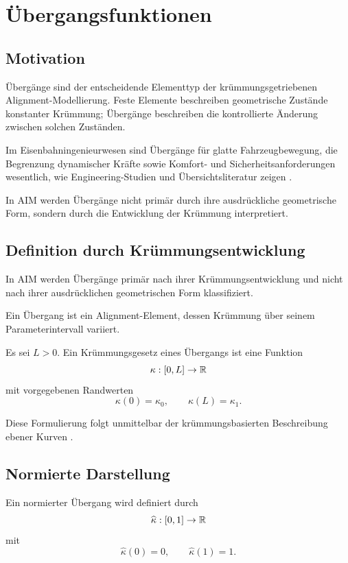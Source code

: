 \chapter{Übergangsfunktionen}

\section*{Motivation}
Übergänge sind der entscheidende Elementtyp der krümmungsgetriebenen
Alignment-Modellierung. Feste Elemente beschreiben geometrische Zustände
konstanter Krümmung; Übergänge beschreiben die kontrollierte Änderung zwischen
solchen Zuständen.

Im Eisenbahningenieurwesen sind Übergänge für glatte Fahrzeugbewegung, die
Begrenzung dynamischer Kräfte sowie Komfort- und Sicherheitsanforderungen
wesentlich, wie Engineering-Studien und Übersichtsliteratur zeigen
\cite{Koc2008TransitionCurves,BrustadDalmo2020Review}.

In AIM werden Übergänge nicht primär durch ihre ausdrückliche geometrische
Form, sondern durch die Entwicklung der Krümmung interpretiert.

\section{Definition durch Krümmungsentwicklung}
\begin{principle}
In AIM werden Übergänge primär nach ihrer Krümmungsentwicklung und nicht nach
ihrer ausdrücklichen geometrischen Form klassifiziert.
\end{principle}
\begin{definition}[Übergang]
Ein Übergang ist ein Alignment-Element, dessen Krümmung über seinem
Parameterintervall variiert.
\end{definition}
\begin{definition}
Es sei \(L>0\). Ein Krümmungsgesetz eines Übergangs ist eine Funktion
\[
\kappa:[0,L]\to\mathbb{R}
\]
mit vorgegebenen Randwerten
\[
\kappa(0)=\kappa_0,\qquad\kappa(L)=\kappa_1.
\]
\end{definition}
Diese Formulierung folgt unmittelbar der krümmungsbasierten Beschreibung
ebener Kurven \cite{DoCarmo1976Curves}.

\section{Normierte Darstellung}
\begin{definition}
Ein normierter Übergang wird definiert durch
\[
\widehat{\kappa}:[0,1]\to\mathbb{R}
\]
mit
\[
\widehat{\kappa}(0)=0,\qquad\widehat{\kappa}(1)=1.
\]
\end{definition}

